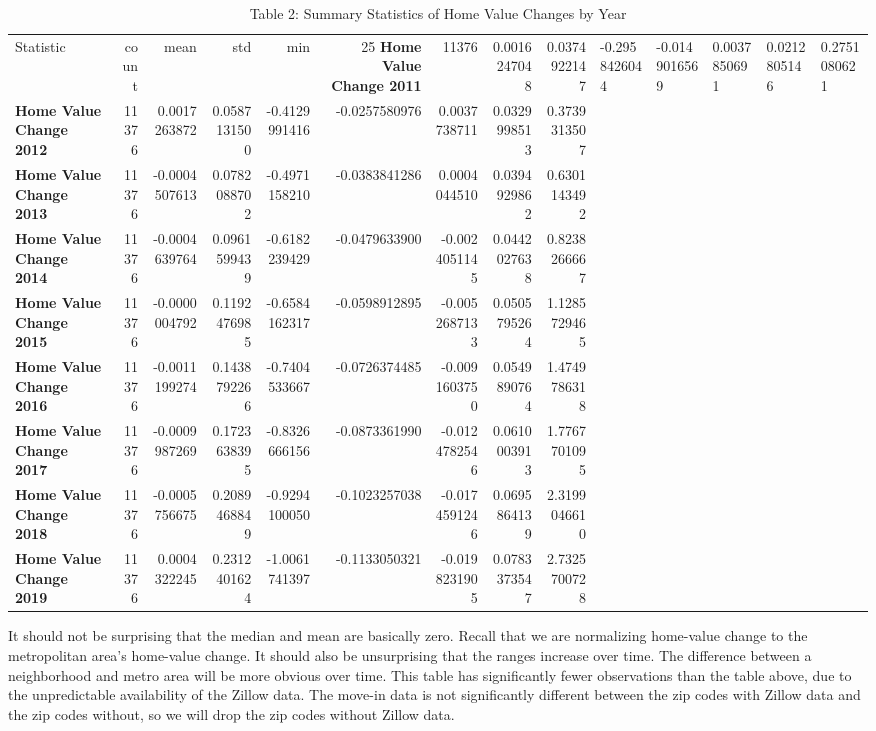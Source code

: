 \documentclass[11pt]{article}
\begin{document}
    \begin{table}
        \caption{Table 2: Summary Statistics of Home Value Changes by Year}
        \label{tab:summary_stats}
        \begin{tabular}{lrrrrrrrr}
        \toprule
        Statistic & count & mean & std & min & 25%
        \midrule
        \textbf{Home Value Change 2011} & 11376 & 0.0016247048 & 0.0374922147 & -0.2958426044 & -0.0149016569 & 0.0037850691 & 0.0212805146 & 0.2751080621 \\
        \textbf{Home Value Change 2012} & 11376 & 0.0017263872 & 0.0587131500 & -0.4129991416 & -0.0257580976 & 0.0037738711 & 0.0329998513 & 0.3739313507 \\
        \textbf{Home Value Change 2013} & 11376 & -0.0004507613 & 0.0782088702 & -0.4971158210 & -0.0383841286 & 0.0004044510 & 0.0394929862 & 0.6301143492 \\
        \textbf{Home Value Change 2014} & 11376 & -0.0004639764 & 0.0961599439 & -0.6182239429 & -0.0479633900 & -0.0024051145 & 0.0442027638 & 0.8238266667 \\
        \textbf{Home Value Change 2015} & 11376 & -0.0000004792 & 0.1192476985 & -0.6584162317 & -0.0598912895 & -0.0052687133 & 0.0505795264 & 1.1285729465 \\
        \textbf{Home Value Change 2016} & 11376 & -0.0011199274 & 0.1438792266 & -0.7404533667 & -0.0726374485 & -0.0091603750 & 0.0549890764 & 1.4749786318 \\
        \textbf{Home Value Change 2017} & 11376 & -0.0009987269 & 0.1723638395 & -0.8326666156 & -0.0873361990 & -0.0124782546 & 0.0610003913 & 1.7767701095 \\
        \textbf{Home Value Change 2018} & 11376 & -0.0005756675 & 0.2089468849 & -0.9294100050 & -0.1023257038 & -0.0174591246 & 0.0695864139 & 2.3199046610 \\
        \textbf{Home Value Change 2019} & 11376 & 0.0004322245 & 0.2312401624 & -1.0061741397 & -0.1133050321 & -0.0198231905 & 0.0783373547 & 2.7325700728 \\
        \bottomrule
        \end{tabular}
        \end{table}
        
    It should not be surprising that the median and mean are basically zero.
Recall that we are normalizing home-value change to the metropolitan
area's home-value change. It should also be unsurprising that the ranges
increase over time. The difference between a neighborhood and metro area
will be more obvious over time. This table has significantly fewer
observations than the table above, due to the unpredictable availability
of the Zillow data. The move-in data is not significantly different
between the zip codes with Zillow data and the zip codes without, so we
will drop the zip codes without Zillow data.
\end{document}

